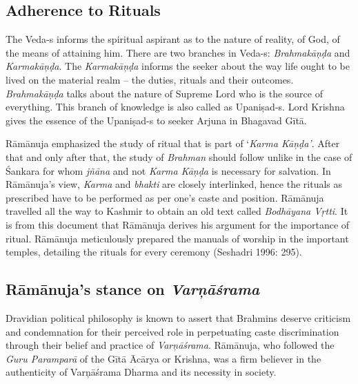 \subsection*{Adherence to Rituals}

The Veda-s informs the spiritual aspirant as to the nature of reality, of God, of the means of attaining him. There are two branches in Veda-s: \textit{Brahmakāņḍa} and \textit{Karmakāņḍa}. The \textit{Karmakāņḍa} informs the seeker about the way life ought to be lived on the material realm – the duties, rituals and their outcomes. \textit{Brahmakāņḍa} talks about the nature of Supreme Lord who is the source of everything. This branch of knowledge is also called as Upaniṣad-s. Lord Krishna gives the essence of the Upaniṣad-s to seeker Arjuna in Bhagavad Gītā.

Rāmānuja emphasized the study of ritual that is part of ‘\textit{Karma Kāņḍa’}. After that and only after that, the study of \textit{Brahman} should follow unlike in the case of Śankara for whom \textit{jñāna }and not \textit{Karma Kāņḍa} is necessary for salvation. In Rāmānuja’s view, \textit{Karma} and \textit{bhakti} are closely interlinked, hence the rituals as prescribed have to be performed as per one’s caste and position. Rāmānuja travelled all the way to Kashmir to obtain an old text called \textit{Bodhāyana Vṛtti}. It is from this document that Rāmānuja derives his argument for the importance of ritual. Rāmānuja meticulously prepared the manuals of worship in the important temples, detailing the rituals for every ceremony (Seshadri 1996: 295).


\subsection*{Rāmānuja’s stance on \textit{Varņāśrama}}

Dravidian political philosophy is known to assert that Brahmins deserve criticism and condemnation for their perceived role in perpetuating caste discrimination through their belief and practice of \textit{Varņāśrama}. Rāmānuja, who followed the \textit{Guru Paramparā} of the Gītā Ācārya or Krishna, was a firm believer in the authenticity of Varņāśrama Dharma and its necessity in society.


